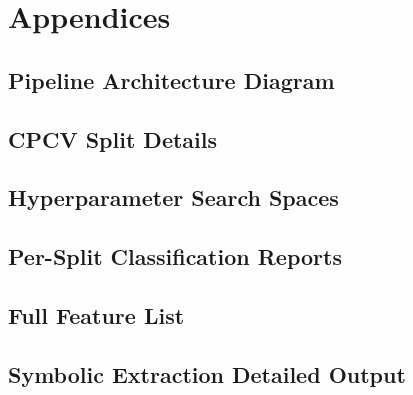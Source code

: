 \documentclass[12pt,a4paper,oneside]{article}
\begin{document}
\newpage
{}
\thispagestyle{plain}




\newpage
{}
\thispagestyle{plain}

\appendix
\section{Appendices}\label{sec:appendices}

\subsection{Pipeline Architecture Diagram}\label{app:pipeline}

\subsection{CPCV Split Details}\label{app:cpcv_splits}

\subsection{Hyperparameter Search Spaces}\label{app:hyperparams}

\subsection{Per-Split Classification Reports}\label{app:split_reports}

\subsection{Full Feature List}\label{app:features}

\subsection{Symbolic Extraction Detailed Output}\label{app:symbolic}


\end{document}
